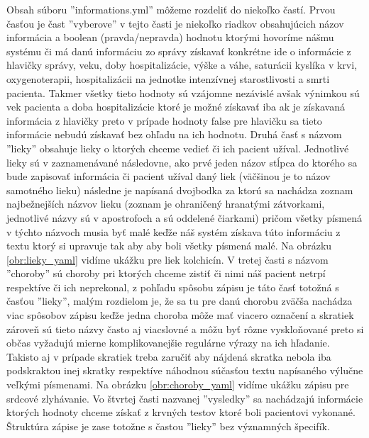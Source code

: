 Obsah súboru ''informations.yml'' môžeme rozdeliť do niekoľko častí. Prvou časťou je čast ''vyberove'' v tejto časti je niekoľko riadkov obsahujúcich názov informácia a boolean (pravda/nepravda) hodnotu ktorými hovoríme nášmu systému či má danú informáciu zo správy získavať konkrétne ide o informácie z hlavičky správy, veku, doby hospitalizácie, výške a váhe, saturácii kyslíka v krvi, oxygenoterapii, hospitalizácii na jednotke intenzívnej starostlivosti a smrti pacienta. Takmer všetky tieto hodnoty sú vzájomne nezávislé avšak výnimkou sú vek pacienta a doba hospitalizácie ktoré je možné získavať iba ak je získavaná informácia z hlavičky preto v prípade hodnoty false pre hlavičku sa tieto informácie nebudú získavať bez ohľadu na ich hodnotu.
Druhá časť s názvom ''lieky'' obsahuje lieky o ktorých chceme vedieť či ich pacient užíval. Jednotlivé lieky sú v zaznamenávané následovne, ako prvé jeden názov stĺpca do ktorého sa bude zapisovať informácia či pacient užíval daný liek (väčšinou je to názov samotného lieku) následne je napísaná dvojbodka za ktorú sa nachádza zoznam najbežnejších názvov lieku (zoznam je ohraničený hranatými zátvorkami, jednotlivé názvy sú v apostrofoch a sú oddelené čiarkami) pričom všetky písmená v týchto názvoch musia byť malé keďže náš systém získava túto informáciu z textu ktorý si upravuje tak aby aby boli všetky písmená malé. Na obrázku \ref{obr:lieky_yaml} vidíme ukážku pre liek kolchicín. 
V tretej časti s názvom ''choroby'' sú choroby pri ktorých chceme zistiť či nimi náš pacient netrpí respektíve či ich neprekonal, z pohľadu spôsobu zápisu je táto časť totožná s časťou ''lieky'', malým rozdielom je, že sa tu pre danú chorobu zväčša nachádza viac spôsobov zápisu keďže jedna choroba môže mať viacero označení a skratiek zároveň sú tieto názvy často aj viacslovné a môžu byť rôzne vyskloňované preto si občas vyžadujú  mierne komplikovanejšie regulárne výrazy na ich hľadanie. Takisto aj v prípade skratiek treba zaručiť aby nájdená skratka nebola iba podskraktou inej skratky respektíve náhodnou súčasťou textu napísaného výlučne veľkými písmenami. Na obrázku \ref{obr:choroby_yaml} vidíme ukážku zápisu pre srdcové zlyhávanie.
Vo štvrtej časti nazvanej ''vysledky'' sa nachádzajú informácie ktorých hodnoty chceme získať z krvných testov ktoré boli pacientovi vykonané. Štruktúra zápise je zase totožne s častou ''lieky'' bez významných špecifík. 
